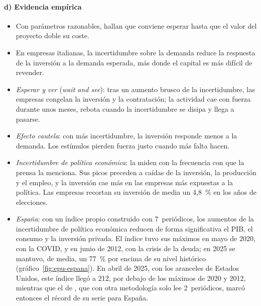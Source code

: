 \documentclass[11pt]{article}
\begin{document}
\paragraph{d) Evidencia empírica}

\begin{itemize}
\item Con parámetros razonables, \textcite{McDonaldSiegel1986Value} hallan que conviene esperar hasta que el valor del proyecto doble su coste.
\item En empresas italianas, la incertidumbre sobre la demanda reduce la respuesta de la inversión a la demanda esperada, más donde el capital es más difícil de revender\nocite{GuisoParigi1999Investment}.
\item \emph{Esperar y ver} (\emph{wait and see}): tras un aumento brusco de la incertidumbre, las empresas congelan la inversión y la contratación; la actividad cae con fuerza durante unos meses, rebota cuando la incertidumbre se disipa y llega a pasarse\nocite{Bloom2009Impact}.
\item \emph{Efecto cautela}: con más incertidumbre, la inversión responde menos a la demanda\nocite{BloomBondVanReenen2007Uncertainty}. Los estímulos pierden fuerza justo cuando más falta hacen.
\item \emph{Incertidumbre de política económica}: \textcite{BakerBloomDavis2016Measuring} la miden con la frecuencia con que la prensa la menciona. Sus picos preceden a caídas de la inversión, la producción y el empleo, y la inversión cae más en las empresas más expuestas a la política. Las empresas recortan su inversión de media un 4,8~\% en los años de elecciones\nocite{JulioYook2012Political}.
\item \emph{España}: con un índice propio construido con 7~periódicos, los aumentos de la incertidumbre de política económica reducen de forma significativa el PIB, el consumo y la inversión privada\nocite{GhirelliPerezUrtasun2019}. El índice tuvo sus máximos en mayo de 2020, con la COVID, y en junio de 2012, con la crisis de la deuda; en 2025 se mantuvo, de media, un 77~\% por encima de su nivel histórico\nocite{BdE2026EPU} (gráfico~\ref{fig:epu-espana}). En abril de 2025, con los aranceles de Estados Unidos, este índice llegó a 212, por debajo de los máximos de 2020 y 2012, mientras que el de \textcite{BakerBloomDavis2016Measuring}, que con otra metodología solo lee 2~periódicos, marcó entonces el récord de su serie para España\nocite{BakerBloomDavis2026EPU}.
\end{itemize}
\end{document}
